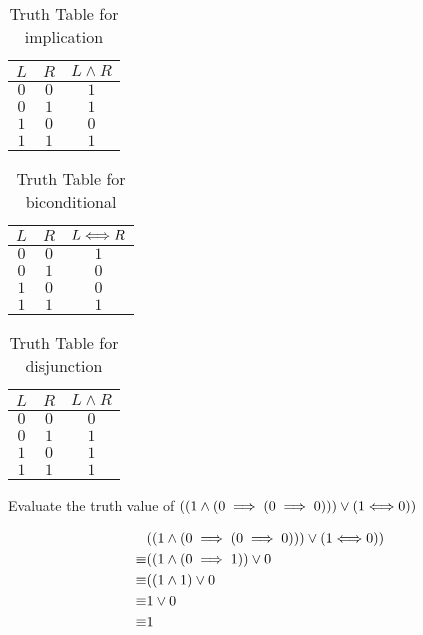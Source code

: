 \begin{table}[h!]
	\begin{center}
		\caption{Truth Table for implication}
		\begin{tabular}{c|c|c} 
			$L$ & $R$ & $L \wedge R$ \\
			\hline
			$0$ & $0$ & $1$ \\ 
			$0$ & $1$ & $1$ \\ 
			$1$ & $0$ & $0$ \\ 
			$1$ & $1$ & $1$ \\ 
		\end{tabular}
	\end{center}
\end{table}

\begin{table}[h!]
	\begin{center}
		\caption{Truth Table for biconditional}
		\begin{tabular}{c|c|c} 
			$L$ & $R$ & $L \Longleftrightarrow R$ \\
			\hline
			$0$ & $0$ & $1$ \\ 
			$0$ & $1$ & $0$ \\ 
			$1$ & $0$ & $0$ \\ 
			$1$ & $1$ & $1$ \\ 
		\end{tabular}
	\end{center}
\end{table}

\begin{table}[h!]
	\begin{center}
		\caption{Truth Table for disjunction}
		\begin{tabular}{c|c|c} 
			$L$ & $R$ & $L \wedge R$ \\
			\hline
			$0$ & $0$ & $0$ \\ 
			$0$ & $1$ & $1$ \\ 
			$1$ & $0$ & $1$ \\ 
			$1$ & $1$ & $1$ \\ 
		\end{tabular}
	\end{center}
\end{table}

\newpage

\begin{example} Evaluate the truth value of 
	$((1 \wedge (0 \implies (0 \implies 0))) \vee (1 \Longleftrightarrow 0))$
	\end{example}

		\begin{align*}
		& ((1 \wedge (0 \implies (0 \implies 0))) \vee (1 \Longleftrightarrow 0))\\
		 \equiv &  ((1 \wedge (0 \implies 1)) \vee 0\\
		 \equiv &  ((1 \wedge 1) \vee 0\\
		 \equiv &  1 \vee 0\\
		 \equiv & 1
	\end{align*}

